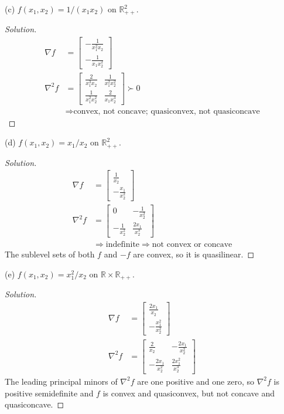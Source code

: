 \documentclass[11pt]{article}
\newenvironment{solution}
  {\renewcommand\qedsymbol{$\square$}\begin{proof}[Solution]}
  {\end{proof}}
\newcommand{\grad}{\nabla}
\newcommand{\hess}{\nabla^2}
\newcommand{\RR}{\mathbb{R}}
\begin{document}
(c) $f\left(x_1, x_2\right)=1 /\left(x_1 x_2\right)$ on $\RR_{++}^2$.
\begin{solution}
  \begin{align*}
    \grad f &= 
    \begin{bmatrix}
      -\frac{1}{x_1^2x_2} \\ -\frac{1}{x_1x_2^2}
    \end{bmatrix}\\
    \hess f &= 
    \begin{bmatrix}
      \frac{2}{x_1^3x_2} & \frac{1}{x_1^2x_2^2} \\ \frac{1}{x_1^2x_2^2} & \frac{2}{x_1x_2^3}
    \end{bmatrix}\succ 0 \\
    &\Rightarrow \text{convex, not concave; quasiconvex, not quasiconcave}
  \end{align*}
\end{solution}

(d) $f\left(x_1, x_2\right)=x_1 / x_2$ on $\RR_{++}^2$.
\begin{solution}
  \begin{align*}
    \grad f &= 
    \begin{bmatrix}
      \frac{1}{x_2} \\ -\frac{x_1}{x_2^2}
    \end{bmatrix}\\
    \hess f &= 
    \begin{bmatrix}
      0 & -\frac{1}{x_2^2} \\ -\frac{1}{x_2^2} & \frac{2x_1}{x_2^3}
    \end{bmatrix} \\
    &\Rightarrow \text{indefinite} \Rightarrow \text{not convex or concave}
  \end{align*}
  The sublevel sets of both $f$ and $-f$ are convex, so it is quasilinear.
\end{solution}

(e) $f\left(x_1, x_2\right)=x_1^2 / x_2$ on $\RR \times \RR_{++}$.
\begin{solution}
  \begin{align*}
    \grad f &= 
    \begin{bmatrix}
      \frac{2x_1}{x_2} \\ -\frac{x_1^2}{x_2^2}
    \end{bmatrix}\\
    \hess f &= 
    \begin{bmatrix}
      \frac{2}{x_2} & -\frac{2x_1}{x_2^2} \\ -\frac{2x_1}{x_2^2} & \frac{2x_1^2}{x_2^3}
    \end{bmatrix}
  \end{align*}
  The leading principal minors of $\hess f$ are one positive and one zero, so $\hess f$ is positive semidefinite and $f$ is convex and quasiconvex, but not concave and quasiconcave.
\end{solution}
  
\end{document}
